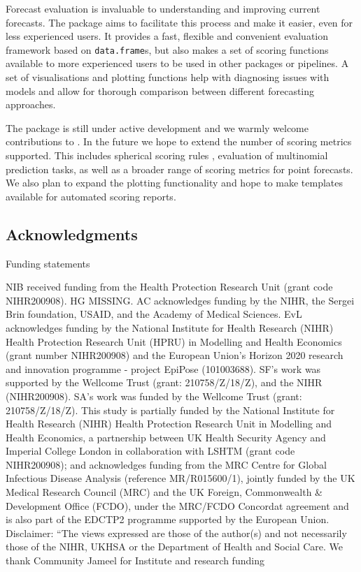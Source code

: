 \documentclass[
]{jss}
\begin{document}
Forecast evaluation is invaluable to understanding and improving current
forecasts. The  package aims to facilitate this
process and make it easier, even for less experienced users. It provides
a fast, flexible and convenient evaluation framework based on
\texttt{data.frame}s, but also makes a set of scoring functions
available to more experienced users to be used in other packages or
pipelines. A set of visualisations and plotting functions help with
diagnosing issues with models and allow for thorough comparison between
different forecasting approaches.

The package is still under active development and we warmly welcome
contributions to . In the future we hope to extend the
number of scoring metrics supported. This includes spherical scoring
rules
\citep{gneitingStrictlyProperScoring2007, joseCharacterizationSphericalScoring2009, macheteContrastingProbabilisticScoring2012},
evaluation of multinomial prediction tasks, as well as a broader range
of scoring metrics for point forecasts. We also plan to expand the
plotting functionality and hope to make templates available for
automated scoring reports.

\hypertarget{acknowledgments}{%
\subsection{Acknowledgments}\label{acknowledgments}}

Funding statements

NIB received funding from the Health Protection Research Unit (grant
code NIHR200908). HG MISSING. AC acknowledges funding by the NIHR, the
Sergei Brin foundation, USAID, and the Academy of Medical Sciences. EvL
acknowledges funding by the National Institute for Health Research
(NIHR) Health Protection Research Unit (HPRU) in Modelling and Health
Economics (grant number NIHR200908) and the European Union's Horizon
2020 research and innovation programme - project EpiPose (101003688).
SF's work was supported by the Wellcome Trust (grant: 210758/Z/18/Z),
and the NIHR (NIHR200908). SA's work was funded by the Wellcome Trust
(grant: 210758/Z/18/Z). This study is partially funded by the National
Institute for Health Research (NIHR) Health Protection Research Unit in
Modelling and Health Economics, a partnership between UK Health Security
Agency and Imperial College London in collaboration with LSHTM (grant
code NIHR200908); and acknowledges funding from the MRC Centre for
Global Infectious Disease Analysis (reference MR/R015600/1), jointly
funded by the UK Medical Research Council (MRC) and the UK Foreign,
Commonwealth \& Development Office (FCDO), under the MRC/FCDO Concordat
agreement and is also part of the EDCTP2 programme supported by the
European Union. Disclaimer: ``The views expressed are those of the
author(s) and not necessarily those of the NIHR, UKHSA or the Department
of Health and Social Care. We thank Community Jameel for Institute and
research funding
\end{document}
